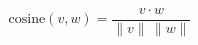 \documentclass[preview]{standalone}
\begin{document}
\begin{align*}
\text{cosine}(v,w)=\dfrac{v\cdot w}{\lVert v\rVert\,\lVert w\rVert}
\end{align*}
\end{document}
